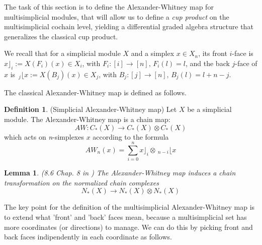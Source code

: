\documentclass[a4paper,11pt]{article}
\newtheorem{lemma}[theorem]{Lemma}
\theoremstyle{remark}
\theoremstyle{definition}
\newtheorem{definition}[theorem]{Definition}
\begin{document}
The task of this section is to define the Alexander-Whitney map for multisimplicial modules, that will allow us to define a \textit{cup product} on the multisimplicial cochain level, yielding a differential graded algebra structure that generalizes the classical cup product.

We recall that for a simplicial module $X$ and a simplex $x \in X_n$, its front $i$-face is $x \rfloor_i := X(F_i )(x) \in X_i$,
with $F_i:[i] \to [n], \, F_i(l)=l$, and the back $j$-face of $x$ is $\,_j \lfloor x := X(B_j)(x) \in X_j$, with 
$B_j:[j] \to [n],\, B_j(l)=l+n-j$. 

The classical Alexander-Whitney map is defined as follows.


\begin{definition}(Simplicial Alexander-Whitney map)
Let $X$ be a simplicial module. The Alexander-Whitney map is a chain map:
	\begin{equation*}
	AW:C_{*}(X) \rightarrow C_{*}(X)\otimes C_{*}(X)
	\end{equation*}
which acts on \textit{n}-simplexes $x$ according to the formula
$$AW_{n}(x)= \sum_{i=0}^{n} x\rfloor_{i} \otimes  \, _{n-i}\lfloor  x$$
 \end{definition}




\begin{lemma}(8.6 Chap. 8  in \cite{maclanehomology})
	\label{normalizedAW}
The Alexander-Whitney map induces a chain transformation on the normalized chain complexes
	\begin{equation*}
	N_*(X) \rightarrow N_*(X)\otimes N_*(X)
	\end{equation*} 
\end{lemma}


The key point for the definition of the multisimplicial Alexander-Whitney map is to extend what 'front' and 'back' faces mean, because a multisimplicial set has more coordinates  (or directions) to manage.
We can do this by picking front and back faces indipendently in each coordinate as follows.
\end{document}
